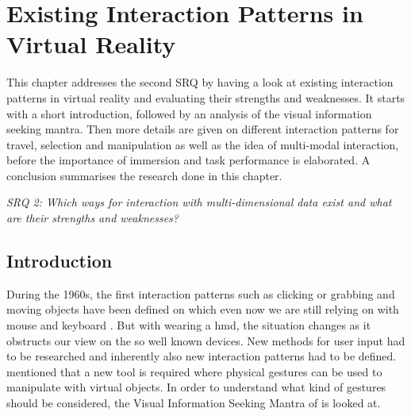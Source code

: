 
\section{Existing Interaction Patterns in Virtual Reality}

\label{SectionLiteratureReviewSRQ2}

This chapter addresses the second SRQ by having a look at existing interaction patterns in virtual reality and evaluating their strengths and weaknesses. It starts with a short introduction, followed by an analysis of the visual information seeking mantra. Then more details are given on different interaction patterns for travel, selection and manipulation as well as the idea of multi-modal interaction, before the importance of immersion and task performance is elaborated. A conclusion summarises the research done in this chapter.
\begin{framed}
	\textit{SRQ 2: Which ways for interaction with multi-dimensional data exist and what are their strengths and weaknesses?}
\end{framed}


\subsection{Introduction}

During the 1960s, the first interaction patterns such as clicking or grabbing and moving objects have been defined on which even now we are still relying on with mouse and keyboard \citep{Myers1998}. But with wearing a \gls{hmd}, the situation changes as it obstructs our view on the so well known devices. New methods for user input had to be researched and inherently also new interaction patterns had to be defined. \cite{Donalek2014} mentioned that a new tool is required where physical gestures can be used to manipulate with virtual objects. In order to understand what kind of gestures should be considered, the Visual Information Seeking Mantra of \cite{Shneiderman1996} is looked at.



